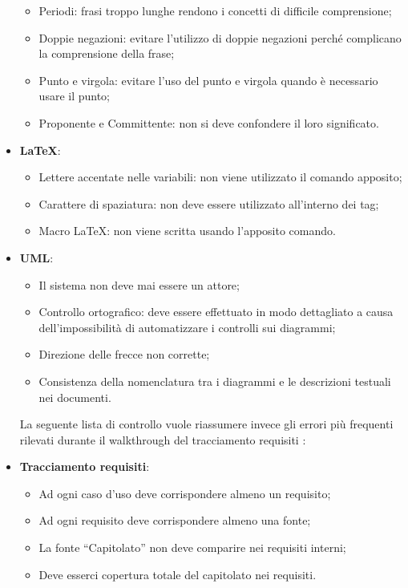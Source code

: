 \begin{itemize}
\begin{itemize}
\item Periodi: frasi troppo lunghe rendono i concetti di difficile comprensione;
\item Doppie negazioni: evitare l’utilizzo di doppie negazioni perché complicano la
comprensione della frase;
\item Punto e virgola: evitare l’uso del punto e virgola quando è necessario usare
il punto;
\item Proponente e Committente: non si deve confondere il loro significato.
\end{itemize}
\item \textbf{\LaTeX}:
\begin{itemize}
\item Lettere accentate nelle variabili: non viene utilizzato il comando apposito;
\item Carattere di spaziatura: non deve essere utilizzato all’interno dei tag;
\item Macro \LaTeX: non viene scritta usando l'apposito comando.
\end{itemize}
\item \textbf{UML}:
\begin{itemize}
\item Il sistema non deve mai essere un attore;
\item Controllo ortografico: deve essere effettuato in modo dettagliato a causa dell'impossibilità di automatizzare i controlli sui diagrammi;
\item Direzione delle frecce non corrette;
\item Consistenza della nomenclatura tra i diagrammi e le descrizioni testuali nei documenti.
\end{itemize}
La seguente lista di controllo vuole riassumere invece gli errori più frequenti rilevati
durante il walkthrough del tracciamento requisiti :

\item \textbf{Tracciamento requisiti}:
\begin{itemize}

\item Ad ogni caso d’uso deve corrispondere almeno un requisito;
\item Ad ogni requisito deve corrispondere almeno una fonte;
\item La fonte “Capitolato” non deve comparire nei requisiti interni;
\item Deve esserci copertura totale del capitolato nei requisiti.

\end{itemize}
\end{itemize}
